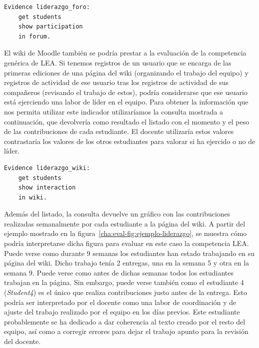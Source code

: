 \begin{verbatim}
Evidence liderazgo_foro: 
	get students
	show participation
	in forum.
\end{verbatim}


				El wiki de Moodle también se podría prestar a la evaluación de la competencia genérica de LEA. Si tenemos registros de un usuario que se encarga de las primeras ediciones de una página del wiki (organizando el trabajo del equipo) y registros de actividad de ese usuario tras los registros de actividad de sus compañeros (revisando el trabajo de estos), podría considerarse que ese usuario está ejerciendo una labor de líder en el equipo. Para obtener la información que nos permita utilizar este indicador utilizaríamos la consulta mostrada a continuación, que devolvería como resultado el listado con el momento y el peso de las contribuciones de cada estudiante. El docente utilizaría estos valores contrastaría los valores de los otros estudiantes para valorar si ha ejercido o no de líder.

\begin{verbatim}
Evidence liderazgo_wiki: 
	get students 
	show interaction 
	in wiki.
\end{verbatim}

Además del listado, la consulta devuelve un gráfico con las contribuciones realizadas semanalmente por cada estudiante a la página del wiki. A partir del ejemplo mostrado en la figura~\ref{cha:eval-fig:ejemplo-liderazgo}, se muestra cómo podría interpretarse dicha figura para evaluar en este caso la competencia LEA. Puede verse como durante 9 semanas los estudiantes han estado trabajando en su página del wiki. Dicho trabajo tenía 2 entregas, una en la semana 5 y otra en la semana 9. Puede verse como antes de dichas semanas todos los estudiantes trabajan en la página. Sin embargo, puede verse también como el estudiante 4 (\emph{Student4}) es el único que realiza contribuciones justo antes de la entrega. Esto podría ser interpretado por el docente como una labor de coordinación y de ajuste del trabajo realizado por el equipo en los días previos. Este estudiante probablemente se ha dedicado a dar coherencia al texto creado por el resto del equipo, así como a corregir errores para dejar el trabajo apunto para la revisión del docente.

